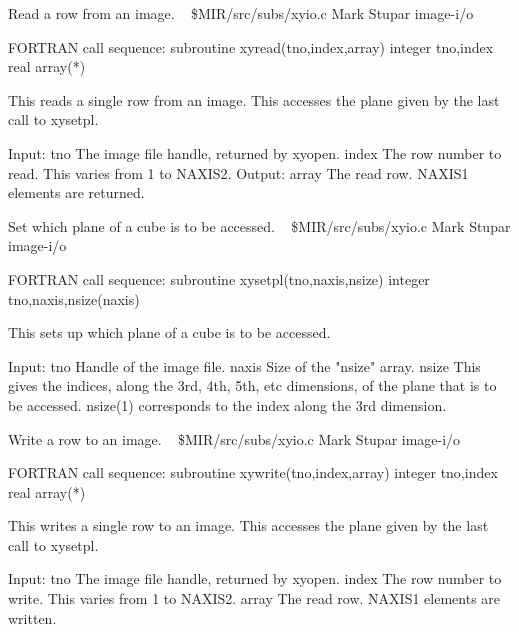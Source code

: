 %
\noindent Read a row from an image.
\newline \ 
\newline {} \$MIR/src/subs/xyio.c
\newline {} Mark Stupar
\newline {} image-i/o
\par{\tenpoint
{\eightpoint\begintt
FORTRAN call sequence:
        subroutine xyread(tno,index,array)
        integer tno,index
        real array(*)

  This reads a single row from an image. This accesses the plane given
  by the last call to xysetpl.

  Input:
    tno         The image file handle, returned by xyopen.
    index       The row number to read. This varies from 1 to NAXIS2.
  Output:
    array       The read row. NAXIS1 elements are returned.             
\endtt}
\par}
%
\noindent Set which plane of a cube is to be accessed.
\newline \ 
\newline {} \$MIR/src/subs/xyio.c
\newline {} Mark Stupar
\newline \abox{Keywords:} image-i/o
\par{\tenpoint
{\eightpoint\begintt
FORTRAN call sequence:
        subroutine xysetpl(tno,naxis,nsize)
        integer tno,naxis,nsize(naxis)

  This sets up which plane of a cube is to be accessed.

  Input:
    tno         Handle of the image file.
    naxis       Size of the "nsize" array.
    nsize       This gives the indices, along the 3rd, 4th, 5th, etc
                dimensions, of the plane that is to be accessed. nsize(1)
                corresponds to the index along the 3rd dimension.       
\endtt}
\par}
%
\noindent Write a row to an image.
\newline \ 
\newline {} \$MIR/src/subs/xyio.c
\newline \abox{Responsible:} Mark Stupar
\newline {} image-i/o
\par{\tenpoint
{\eightpoint\begintt
FORTRAN call sequence:
        subroutine xywrite(tno,index,array)
        integer tno,index
        real array(*)

  This writes a single row to an image. This accesses the plane given
  by the last call to xysetpl.

  Input:
    tno         The image file handle, returned by xyopen.
    index       The row number to write. This varies from 1 to NAXIS2.
    array       The read row. NAXIS1 elements are written.              
\endtt}
\par}
